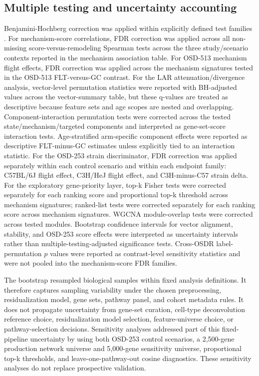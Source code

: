 \documentclass[11pt]{article}
\begin{document}
\subsection{Multiple testing and uncertainty accounting}

Benjamini-Hochberg correction was applied within explicitly defined test families \citep{benjamini1995controlling}. For mechanism-score correlations, FDR correction was applied across all non-missing score-versus-remodeling Spearman tests across the three study/scenario contexts reported in the mechanism association table. For OSD-513 mechanism flight effects, FDR correction was applied across the mechanism signatures tested in the OSD-513 FLT-versus-GC contrast. For the LAR attenuation/divergence analysis, vector-level permutation statistics were reported with BH-adjusted values across the vector-summary table, but these q-values are treated as descriptive because feature sets and age scopes are nested and overlapping. Component-interaction permutation tests were corrected across the tested state/mechanism/targeted components and interpreted as gene-set-score interaction tests. Age-stratified arm-specific component effects were reported as descriptive FLT-minus-GC estimates unless explicitly tied to an interaction statistic. For the OSD-253 strain discriminator, FDR correction was applied separately within each control scenario and within each endpoint family: C57BL/6J flight effect, C3H/HeJ flight effect, and C3H-minus-C57 strain delta. For the exploratory gene-priority layer, top-k Fisher tests were corrected separately for each ranking score and proportional top-k threshold across mechanism signatures; ranked-list tests were corrected separately for each ranking score across mechanism signatures. WGCNA module-overlap tests were corrected across tested modules. Bootstrap confidence intervals for vector alignment, stability, and OSD-253 score effects were interpreted as uncertainty intervals rather than multiple-testing-adjusted significance tests. Cross-OSDR label-permutation $p$ values were reported as contrast-level sensitivity statistics and were not pooled into the mechanism-score FDR families.

The bootstrap resampled biological samples within fixed analysis definitions. It therefore captures sampling variability under the chosen preprocessing, residualization model, gene sets, pathway panel, and cohort metadata rules. It does not propagate uncertainty from gene-set curation, cell-type deconvolution reference choice, residualization model selection, feature-universe choice, or pathway-selection decisions. Sensitivity analyses addressed part of this fixed-pipeline uncertainty by using both OSD-253 control scenarios, a 2,500-gene production network universe and 5,000-gene sensitivity universe, proportional top-k thresholds, and leave-one-pathway-out cosine diagnostics. These sensitivity analyses do not replace prospective validation.
\end{document}
